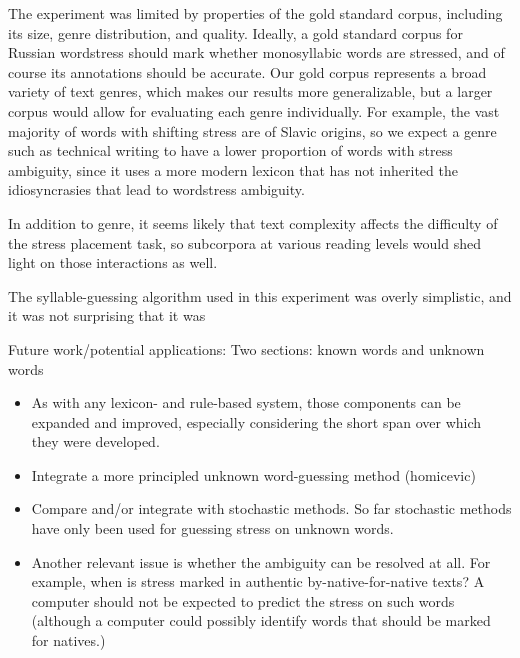 \documentclass[11pt]{article}
\begin{document}
The experiment was limited by properties of the gold standard corpus, including
its size, genre distribution, and quality. Ideally, a gold standard corpus for Russian wordstress should mark 
whether monosyllabic words are stressed, and of course its annotations should
be accurate. Our gold corpus represents a broad variety of text genres, which 
makes our results more generalizable, but a larger corpus would allow for
evaluating each genre individually. For example, the vast majority of words with
shifting stress are of Slavic origins, so we expect a genre such as technical
writing to have a lower proportion of words with stress ambiguity, since it
uses a more modern lexicon that has not inherited the idiosyncrasies that lead
to wordstress ambiguity.

In addition to genre, it seems likely that text
complexity affects the difficulty of the stress placement task, so subcorpora at
various reading levels would shed light on those interactions as well.

The syllable-guessing algorithm used in this experiment was overly simplistic,
and it was not surprising that it was 

Future work/potential applications:
Two sections: known words and unknown words
\begin{itemize}
\item As with any lexicon- and rule-based system, those components can be expanded and improved, especially considering the short span over which they were developed.
\item Integrate a more principled unknown word-guessing method (homicevic)
\item Compare and/or integrate with stochastic methods. So far stochastic
methods have only been used for guessing stress on unknown words.
\item Another relevant issue is whether the ambiguity can be resolved at all. For example, when is stress marked in authentic by-native-for-native texts? A computer should not be expected to predict the stress on such words (although a computer could possibly identify words that should be marked for 
natives.)

\end{itemize}
%



\end{document}
